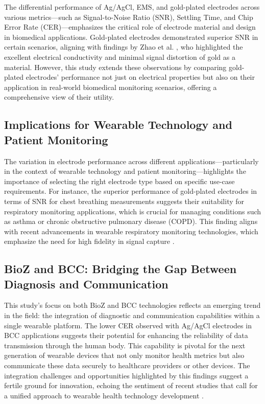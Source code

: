 \documentclass[conference]{IEEEtran}
\begin{document}
The differential performance of Ag/AgCl, EMS, and gold-plated electrodes across various metrics—such as Signal-to-Noise Ratio (SNR), Settling Time, and Chip Error Rate (CER)—emphasizes the critical role of electrode material and design in biomedical applications. Gold-plated electrodes demonstrated superior SNR in certain scenarios, aligning with findings by Zhao et al. \cite{Zhao2018Fabrication}, who highlighted the excellent electrical conductivity and minimal signal distortion of gold as a material. However, this study extends these observations by comparing gold-plated electrodes' performance not just on electrical properties but also on their application in real-world biomedical monitoring scenarios, offering a comprehensive view of their utility.

\subsection{Implications for Wearable Technology and Patient Monitoring}

The variation in electrode performance across different applications—particularly in the context of wearable technology and patient monitoring—highlights the importance of selecting the right electrode type based on specific use-case requirements. For instance, the superior performance of gold-plated electrodes in terms of SNR for chest breathing measurements suggests their suitability for respiratory monitoring applications, which is crucial for managing conditions such as asthma or chronic obstructive pulmonary disease (COPD). This finding aligns with recent advancements in wearable respiratory monitoring technologies, which emphasize the need for high fidelity in signal capture \cite{rabbani2023low}.

\subsection{BioZ and BCC: Bridging the Gap Between Diagnosis and Communication}

This study's focus on both BioZ and BCC technologies reflects an emerging trend in the field: the integration of diagnostic and communication capabilities within a single wearable platform. The lower CER observed with Ag/AgCl electrodes in BCC applications suggests their potential for enhancing the reliability of data transmission through the human body. This capability is pivotal for the next generation of wearable devices that not only monitor health metrics but also communicate these data securely to healthcare providers or other devices. The integration challenges and opportunities highlighted by this findings suggest a fertile ground for innovation, echoing the sentiment of recent studies that call for a unified approach to wearable health technology development \cite{zaira2023prediction}.
\end{document}
